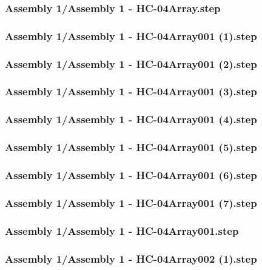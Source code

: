 \documentclass[a4paper,12pt]{article}
\begin{document}
\subsubsection{Assembly 1/Assembly 1 - HC-04Array.step}

\subsubsection{Assembly 1/Assembly 1 - HC-04Array001 (1).step}

\subsubsection{Assembly 1/Assembly 1 - HC-04Array001 (2).step}

\subsubsection{Assembly 1/Assembly 1 - HC-04Array001 (3).step}

\subsubsection{Assembly 1/Assembly 1 - HC-04Array001 (4).step}

\subsubsection{Assembly 1/Assembly 1 - HC-04Array001 (5).step}

\subsubsection{Assembly 1/Assembly 1 - HC-04Array001 (6).step}

\subsubsection{Assembly 1/Assembly 1 - HC-04Array001 (7).step}

\subsubsection{Assembly 1/Assembly 1 - HC-04Array001.step}

\subsubsection{Assembly 1/Assembly 1 - HC-04Array002 (1).step}

\end{document}
